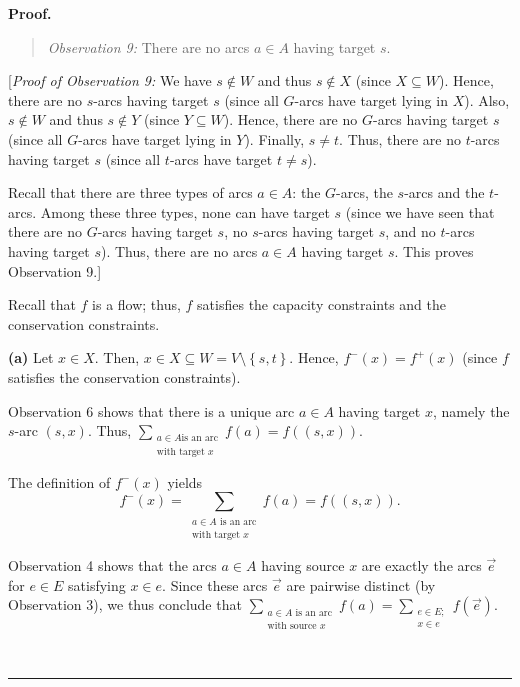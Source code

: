 \documentclass[numbers=enddot,12pt,final,onecolumn,notitlepage]{scrartcl}%
\theoremstyle{definition}
\newenvironment{statement}{\begin{quote}}{\end{quote}}
\newenvironment{proof}[1][Proof]{\noindent\textbf{#1.} }{\ \rule{0.5em}{0.5em}}
\let\sumnonlimits\sum
\renewcommand{\sum}{\sumnonlimits\limits}
\begin{document}
\begin{proof}
\begin{statement}
\textit{Observation 9:} There are no arcs $a\in A$ having target $s$.
\end{statement}

[\textit{Proof of Observation 9:} We have $s\notin W$ and thus $s\notin X$
(since $X\subseteq W$). Hence, there are no $s$-arcs having target $s$ (since
all $G$-arcs have target lying in $X$). Also, $s\notin W$ and thus $s\notin Y$
(since $Y\subseteq W$). Hence, there are no $G$-arcs having target $s$ (since
all $G$-arcs have target lying in $Y$). Finally, $s\neq t$. Thus, there are no
$t$-arcs having target $s$ (since all $t$-arcs have target $t\neq s$).

Recall that there are three types of arcs $a\in A$: the $G$-arcs, the $s$-arcs
and the $t$-arcs. Among these three types, none can have target $s$ (since we
have seen that there are no $G$-arcs having target $s$, no $s$-arcs having
target $s$, and no $t$-arcs having target $s$). Thus, there are no arcs $a\in
A$ having target $s$. This proves Observation 9.]

Recall that $f$ is a flow; thus, $f$ satisfies the capacity constraints and
the conservation constraints.

\textbf{(a)} Let $x\in X$. Then, $x\in X\subseteq W=V\setminus\left\{
s,t\right\}  $. Hence, $f^{-}\left(  x\right)  =f^{+}\left(  x\right)  $
(since $f$ satisfies the conservation constraints).

Observation 6 shows that there is a unique arc $a\in A$ having target $x$,
namely the $s$-arc $\left(  s,x\right)  $. Thus, $\sum_{\substack{a\in A\text{
is an arc}\\\text{with target }x}}f\left(  a\right)  =f\left(  \left(
s,x\right)  \right)  $.

The definition of $f^{-}\left(  x\right)  $ yields
\begin{equation}
f^{-}\left(  x\right)  =\sum_{\substack{a\in A\text{ is an arc}\\\text{with
target }x}}f\left(  a\right)  =f\left(  \left(  s,x\right)  \right)  .
\label{pf.prop.hall.lem1.a.f-}%
\end{equation}


Observation 4 shows that the arcs $a\in A$ having source $x$ are exactly the
arcs $\overrightarrow{e}$ for $e\in E$ satisfying $x\in e$. Since these arcs
$\overrightarrow{e}$ are pairwise distinct (by Observation 3), we thus
conclude that $\sum_{\substack{a\in A\text{ is an arc}\\\text{with source }%
x}}f\left(  a\right)  =\sum_{\substack{e\in E;\\x\in e}}f\left(
\overrightarrow{e}\right)  $.


\end{proof}
\end{document}

